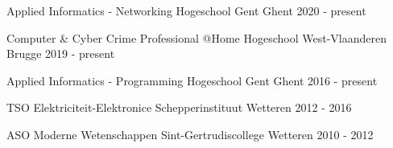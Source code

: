 

\begin{cventries}
	
\cventry
{Applied Informatics - Networking} %
{Hogeschool Gent} %
{Ghent} %
{2020 - present} %
{
}

\cventry
{Computer \& Cyber Crime Professional @Home} %
{Hogeschool West-Vlaanderen} %
{Brugge} %
{2019 - present} %
{
}

\cventry
{Applied Informatics - Programming} %
{Hogeschool Gent} %
{Ghent} %
{2016 - present} %
{
}

\cventry
{TSO Elektriciteit-Elektronice} %
{Schepperinstituut} %
{Wetteren} %
{2012 - 2016} %
{
}

  \cventry
    {ASO Moderne Wetenschappen} %
    {Sint-Gertrudiscollege} %
    {Wetteren} %
    {2010 - 2012} %
    {
    }

\end{cventries}
